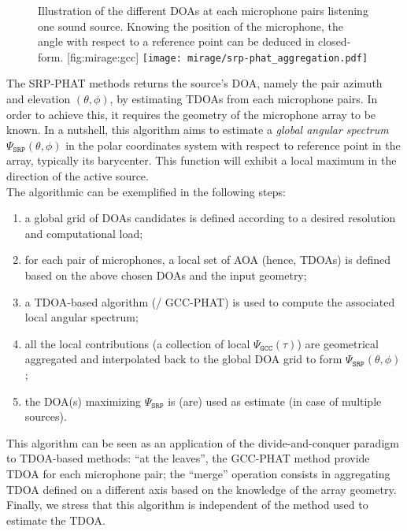 \mynewline
\begin{figure}
    \begin{sidecaption}[t]{
        Illustration of the different \acp{DOA} at each microphone pairs listening one sound source.
        Knowing the position of the microphone, the angle with respect to a reference point can be deduced in closed-form.
    }[fig:mirage:gcc]
        \texttt{[image: mirage/srp-phat\_aggregation.pdf]}
    \end{sidecaption}
\end{figure}
The \ac{SRP-PHAT} methods returns the source's \ac{DOA}, namely the pair azimuth and elevation $(\theta, \phi)$, by estimating \acp{TDOA} from each microphone pairs.
In order to achieve this, it requires the geometry of the microphone array to be known.
In a nutshell, this algorithm aims to estimate a \textit{global angular spectrum} $\Psi_{\mathtt{SRP}}(\theta,\phi)$ in the polar coordinates system with respect to reference point in the array, typically its barycenter.
This function will exhibit a local maximum in the direction of the active source.
\\The algorithmic can be exemplified in the following steps:
\begin{enumerate}
    \item a global grid of \acp{DOA} candidates is defined according to a desired resolution and computational load;
    \item for each pair of microphones, a local set of \ac{AOA} (hence, \acp{TDOA}) is defined based on the above chosen \acp{DOA} and the input geometry;
    \item a TDOA-based algorithm (\eg/ \ac{GCC-PHAT}) is used to compute the associated local angular spectrum;
    \item all the local contributions (a collection of local $\Psi_\mathtt{GCC}(\tau)$) are geometrical aggregated and interpolated back to the global \ac{DOA} grid to form $\Psi_{\mathtt{SRP}}(\theta,\phi)$;
    \item the \acs{DOA}(s) maximizing $\Psi_\mathtt{SRP}$ is (are) used as estimate (in case of multiple sources).
\end{enumerate}
This algorithm can be seen as an application of the divide-and-conquer paradigm to \ac{TDOA}-based methods:
``at the leaves'', the \ac{GCC-PHAT} method provide \ac{TDOA} for each microphone pair;
the ``merge'' operation consists in aggregating \ac{TDOA} defined on a different axis based on the knowledge of the array geometry.
Finally, we stress that this algorithm is independent of the method used to estimate the \ac{TDOA}.

